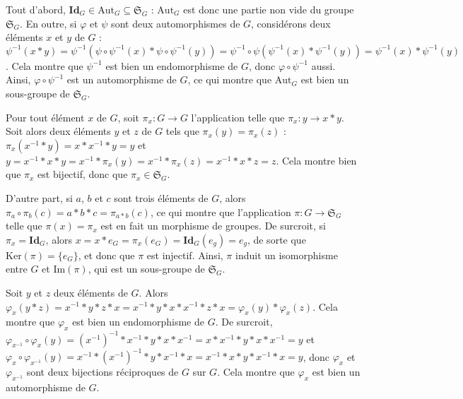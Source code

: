 \begin{sol}
Tout d'abord, $\mathbf{Id}_G \in \mathrm{Aut}_G \subseteq \mathfrak{S}_G$ :
$\mathrm{Aut}_G$ est donc une partie non vide du groupe $\mathfrak{S}_G$.
En outre, si $\varphi$ et $\psi$ sont deux automorphismes de $G$, considérons deux éléments $x$ et $y$ de $G$ :
$\psi^{-1}(x \ast y) = \psi^{-1}(\psi\circ\psi^{-1}(x) \ast \psi\circ\psi^{-1}(y)) =
\psi^{-1}\circ\psi(\psi^{-1}(x) \ast \psi^{-1}(y)) = \psi^{-1}(x) \ast \psi^{-1}(y)$.
Cela montre que $\psi^{-1}$ est bien un endomorphisme de $G$, donc $\varphi\circ\psi^{-1}$ aussi.
Ainsi, $\varphi\circ\psi^{-1}$ est un automorphisme de $G$, ce qui montre que $\mathrm{Aut}_G$ est
bien un sous-groupe de $\mathfrak{S}_G$.
\end{sol}

\begin{sol}
Pour tout élément $x$ de $G$, soit $\pi_x : G \to G$ l'application telle que
$\pi_x : y \to x \ast y$.
Soit alors deux éléments $y$ et $z$ de $G$ tels que $\pi_x(y) = \pi_x(z)$ :
$\pi_x (x^{-1} \ast y) = x \ast x^{-1} \ast y = y$ et
$y = x^{-1} \ast x \ast y = x^{-1} \ast \pi_x(y) = x^{-1} \ast \pi_x(z) = x^{-1} \ast x \ast z = z$.
Cela montre bien que $\pi_x$ est bijectif, donc que $\pi_x \in \mathfrak{S}_G$.

D'autre part, si $a$, $b$ et $c$ sont trois éléments de $G$, alors
$\pi_a\circ\pi_b(c) = a \ast b \ast c = \pi_{a \ast b}(c)$,
ce qui montre que l'application $\pi : G \to \mathfrak{S}_G$ telle que
$\pi(x) = \pi_x$ est en fait un morphisme de groupes.
De surcroit, si $\pi_x = \mathbf{Id}_G$, alors
$x = x\ast e_G = \pi_x(e_G) = \mathbf{Id}_G(e_g) = e_g$, de sorte que
$\mathrm{Ker}(\pi) = \{e_G\}$, et donc que $\pi$ est injectif.
Ainsi, $\pi$ induit un isomorphisme entre $G$ et $\mathrm{Im}(\pi)$,
qui est un sous-groupe de $\mathfrak{S}_G$.
\end{sol}

\begin{sol}
Soit $y$ et $z$ deux éléments de $G$. Alors
$\varphi_x(y \ast z) = x^{-1} \ast y \ast z \ast x =
x^{-1} \ast y \ast x \ast x^{-1} \ast z \ast x = \varphi_x(y) \ast \varphi_x(z)$.
Cela montre que $\varphi_x$ est bien un endomorphisme de $G$.
De surcroit, $\varphi_{x^{-1}}\circ\varphi_x(y) = (x^{-1})^{-1} \ast x^{-1} \ast y \ast x \ast x^{-1} =
x \ast x^{-1} \ast y \ast x \ast x^{-1} = y$ et
$\varphi_x\circ\varphi_{x^{-1}}(y) = x^{-1} \ast (x^{-1})^{-1} \ast y \ast x^{-1} \ast x =
x^{-1} \ast x \ast y \ast x^{-1} \ast x = y$, donc
$\varphi_x$ et $\varphi_{x^{-1}}$ sont deux bijections réciproques de $G$ sur $G$.
Cela montre que $\varphi_x$ est bien un automorphisme de $G$.
\end{sol}

